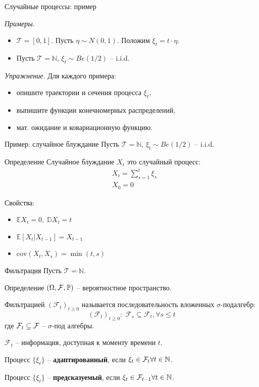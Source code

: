 \documentclass{beamer}
\begin{document}
\begin{frame}{Случайные процессы: пример}
    
    \textit{Примеры.}
    \begin{itemize}
        \item $\mathcal{T}=[0,1]$. Пусть $\eta \sim N(0,1)$. Положим $\xi_t = t \cdot \eta$. 
        \item Пусть $\mathcal{T}=\mathbb{N}$, $\xi_t \sim Be(1/2)$ -- i.i.d.
    \end{itemize}
    \textit{Упражнение.}
    Для каждого примера: 
    \begin{itemize}
        \item опишите траектории и сечения процесса $\xi_t$,
        \item выпишите функции конечномерных распределений,
        \item мат. ожидание и ковариационную функцию.
    \end{itemize}
\end{frame}

\begin{frame}{Пример: случайное блуждание}
    Пусть $\mathcal{T}=\mathbb{N}$, $\xi_t \sim Be(1/2)$ -- i.i.d.
    \begin{block}{Определение}
        Случайное блуждание $X_t$ это случайный процесс:
        \begin{align*}
            & X_t = \sum_{s=1}^{t} \xi_s \\
            & X_0 = 0
        \end{align*}            
    \end{block}
     
    Свойства:
    \begin{itemize}
        \item $\mathbb{E} X_t = 0, \; \mathbb{D} X_t = t$
        \item $\mathbb{E} \left[ X_t | X_{t-1} \right] = X_{t-1}$
        \item $\mathrm{cov}(X_t, X_s) = \min(t, s)$
    \end{itemize}
\end{frame}

\begin{frame}{Фильтрация}
    Пусть $\mathcal{T} = \mathbb{N}$.
    \begin{block}{Определение}
        \((\Omega, \mathcal{F}, \mathbb{P})\) -- вероятностное пространство.
        
        Фильтрацией $(\mathcal{F}_t)_{t \geq 0}$ называется последовательность вложенных $\sigma$-подалгебр:
        $$
            (\mathcal{F}_t)_{t \geq 0}: \; \mathcal{F}_s \subseteq \mathcal{F}_t, \forall s\leq t
        $$
        где $\mathcal{F}_t \subseteq \mathcal{F}$ -- $\sigma$-под алгебры.   
    \end{block}

    $\mathcal{F}_t$ -- информация, доступная к моменту времени $t$.

    Процесс $\{\xi_t\}$ -- \textbf{адаптированный}, если $\xi_t \in \mathcal{F}_t \forall t \in \mathbb{N}$.

    Процесс $\{\xi_t\}$ -- \textbf{предсказуемый}, если $\xi_t \in \mathcal{F}_{t-1} \forall t \in \mathbb{N}$.
\end{frame}
\end{document}

